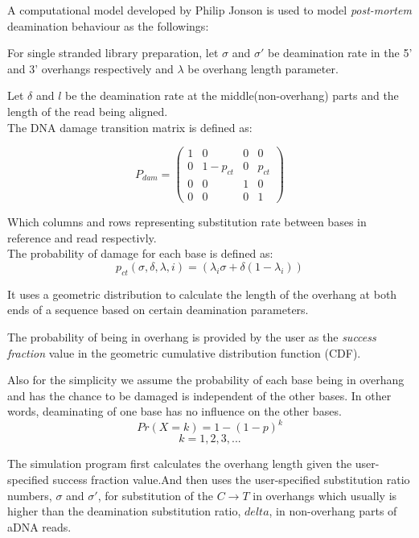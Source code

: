 \documentclass[11pt,a4paper]{report}
\begin{document}
A computational model developed by Philip Jonson \cite{mapdamage2} is used to model
\emph{post-mortem} deamination behaviour as the followings:

For single stranded library preparation,
let $\sigma$ and $\sigma\prime $ be deamination rate in the 5' and 3' overhangs 
respectively and $\lambda$ be overhang length parameter. 

Let  $\delta$ and $l$ be the deamination rate at the middle(non-overhang) parts 
and the length of the read being aligned.\\

The DNA damage transition matrix is defined as:

$$ P_{dam} = 
 \begin{pmatrix}
  1 & 0 & 0 & 0 \\
  0 & 1-p_{ct} & 0 & p_{ct} \\
  0  & 0  & 1 & 0  \\
  0 & 0 & 0 & 1 
 \end{pmatrix}$$
 
Which columns and rows representing substitution rate between bases in reference 
and read respectivly.\\
The probability of damage for each base is defined as\cite{mapdamage2}:\\
$$ p_{ct}(\sigma, \delta, \lambda, i) = ( \lambda_{i} \sigma + \delta(1 - \lambda_{i})) $$
 
It uses a geometric distribution to calculate the length of the overhang at both 
ends of a sequence based on certain deamination parameters.

The probability of being in overhang is provided by the user as the \emph{success 
fraction} value in the geometric cumulative distribution function (CDF).

Also for the simplicity we assume the probability of each base being in overhang 
and has the chance to be damaged is independent of the other bases. In other 
words, deaminating of one base has no influence on the other bases.\\

$$Pr( X=k ) = 1 - (1 - p)^{k}$$
$$ k = 1, 2, 3, ... $$


The simulation program first calculates the overhang length given the user-specified 
success fraction value.And then uses the user-specified substitution ratio numbers,
 $ \sigma $ and $\sigma\prime $, for substitution of the $ C \rightarrow T $ in 
overhangs which usually is higher than the deamination substitution ratio, $delta$, 
in non-overhang parts of aDNA reads.
\end{document}
